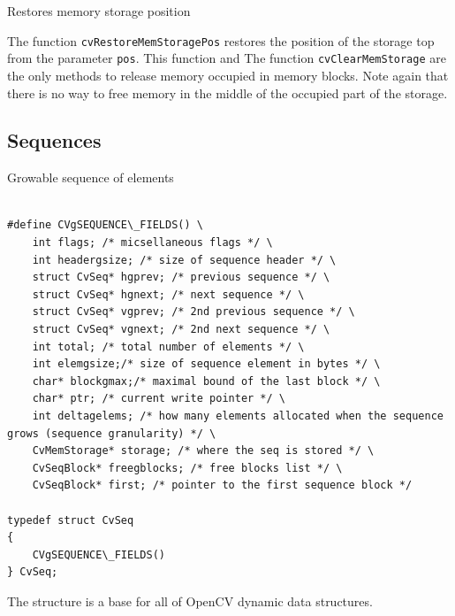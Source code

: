 Restores memory storage position


\begin{description}
\end{description}

The function \texttt{cvRestoreMemStoragePos} restores the position of the storage top from the parameter \texttt{pos}. This function and The function \texttt{cvClearMemStorage} are the only methods to release memory occupied in memory blocks. Note again that there is no way to free memory in the middle of the occupied part of the storage.

\subsection{Sequences}

\label{CvSeq}

Growable sequence of elements

\begin{lstlisting}

#define CVgSEQUENCE\_FIELDS() \
    int flags; /* micsellaneous flags */ \
    int headergsize; /* size of sequence header */ \
    struct CvSeq* hgprev; /* previous sequence */ \
    struct CvSeq* hgnext; /* next sequence */ \
    struct CvSeq* vgprev; /* 2nd previous sequence */ \
    struct CvSeq* vgnext; /* 2nd next sequence */ \
    int total; /* total number of elements */ \
    int elemgsize;/* size of sequence element in bytes */ \
    char* blockgmax;/* maximal bound of the last block */ \
    char* ptr; /* current write pointer */ \
    int deltagelems; /* how many elements allocated when the sequence grows (sequence granularity) */ \
    CvMemStorage* storage; /* where the seq is stored */ \
    CvSeqBlock* freegblocks; /* free blocks list */ \
    CvSeqBlock* first; /* pointer to the first sequence block */

typedef struct CvSeq
{
    CVgSEQUENCE\_FIELDS()
} CvSeq;

\end{lstlisting}

The structure \cross{CvSeq} is a base for all of OpenCV dynamic data structures.


